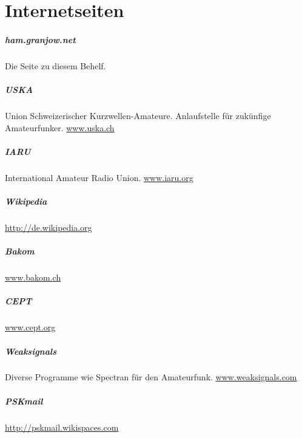 \chapter{Internetseiten}

\paragraph{ham.granjow.net} Die Seite zu diesem Behelf.

\paragraph{USKA} Union Schweizerischer Kurzwellen-Amateure. Anlaufstelle für zukünfige Amateurfunker. \href{http://www.uska.ch}{www.uska.ch}

\paragraph{IARU} International Amateur Radio Union. \href{http://www.iaru.org}{www.iaru.org}

\paragraph{Wikipedia} \href{http://de.wikipedia.org}{http://de.wikipedia.org}

\paragraph{Bakom} \href{http://www.bakom.ch}{www.bakom.ch}

\paragraph{CEPT} \href{http://www.cept.org}{www.cept.org}

\paragraph{Weaksignals} Diverse Programme wie Spectran für den Amateurfunk. \href{http://www.weaksignals.com}{www.weaksignals.com}

\paragraph{PSKmail} \href{http://pskmail.wikispaces.com}{http://pskmail.wikispaces.com}